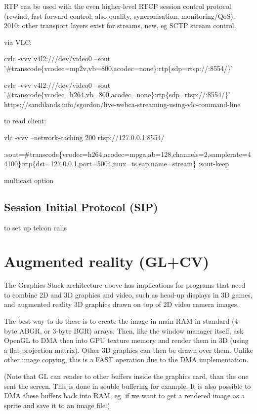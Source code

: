 \documentclass[oneside,english]{scrbook}
\begin{document}
RTP can be used with the even higher-level RTCP session control protocol (rewind, fast forward control; also quality, syncronisation, monitoring/QoS).   2010: other transport layers exist for streams, new, eg SCTP stream control.

via VLC: 

cvlc -vvv v4l2:///dev/video0 --sout '\#transcode\{vcodec=mp2v,vb=800,acodec=none\}:rtp\{sdp=rtsp://:8554/\}' 

cvlc -vvv v4l2:///dev/video0 --sout '\#transcode\{vcodec=h264,vb=800,acodec=none\}:rtp\{sdp=rtsp://:8554/\}'
https://sandilands.info/sgordon/live-webca-streaming-using-vlc-command-line

to read client: 

vlc -vvv --network-caching 200 rtsp://127.0.0.1:8554/

:sout=\#transcode\{vcodec=h264,acodec=mpga,ab=128,channels=2,samplerate=44100\}:rtp\{dst=127.0.0.1,port=5004,mux=ts,sap,name=stream\}
:sout-keep

multicast option


\section{Session Initial Protocol (SIP)}

to set up telcon calls


\chapter{Augmented reality (GL+CV)}

The Graphics Stack architecture above has implications for programs that need to combine 2D and 3D graphics and video, such as head-up displays in 3D games, and augmented reality 3D graphics drawn on top of 2D video camera images.

The best way to do these is to create the image in main RAM in standard (4-byte ABGR, or 3-byte BGR) arrays. Then, like the window manager itself, ask OpenGL to DMA then into GPU texture memory and render them in 3D (using a flat projection matrix). Other 3D graphics can then be drawn over them.  Unlike other image copying, this is a FAST operation due to the DMA implementation.

(Note that GL can render to other buffers inside the graphics card, than the one sent the screen. This is done in souble buffering for example. It is also possible to DMA these buffers back into RAM, eg. if we want to get a rendered image as a sprite and save it to an image file.)
\end{document}
